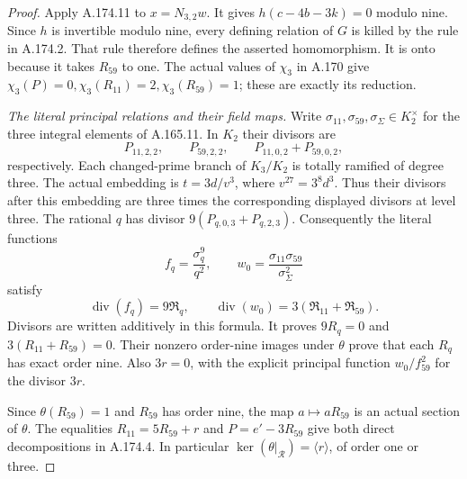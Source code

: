 \begin{proof}
Apply A.174.11 to \(x=N_{3,2}w\).
It gives \(h(c-4b-3k)=0\) modulo nine.
Since \(h\) is invertible modulo nine, every defining relation
of \(G\) is killed by the rule in A.174.2.
That rule therefore defines the asserted homomorphism.
It is onto because it takes \(R_{59}\) to one.
The actual values of \(\chi_3\) in A.170 give
\(\chi_3(P)=0,\chi_3(R_{11})=2,\chi_3(R_{59})=1\);
these are exactly its reduction.

\emph{The literal principal relations and their field maps.}
Write \(\sigma_{11},\sigma_{59},\sigma_\Sigma\in K_2^\times\)
for the three integral elements of A.165.11.
In \(K_2\) their divisors are
\[
 P_{11,2,2},\qquad P_{59,2,2},\qquad
                       P_{11,0,2}+P_{59,0,2},
\]
respectively.  Each changed-prime branch of \(K_3/K_2\) is
totally ramified of degree three.  The actual embedding is
\(t=3d/v^3\), where \(v^{27}=3^8d^3\).
Thus their divisors after this embedding are three times the
corresponding displayed divisors at level three.
The rational \(q\) has divisor
\(9(P_{q,0,3}+P_{q,2,3})\).  Consequently the literal functions
\[
       f_q=\frac{\sigma_q^9}{q^2},\qquad
       w_0=\frac{\sigma_{11}\sigma_{59}}{\sigma_\Sigma^2}
\tag{A.174.14}
\]
satisfy
\[
 \operatorname{div}(f_q)=9\mathfrak R_q,\qquad
 \operatorname{div}(w_0)=3(\mathfrak R_{11}+\mathfrak R_{59}).
\tag{A.174.15}
\]
Divisors are written additively in this formula.
It proves \(9R_q=0\) and \(3(R_{11}+R_{59})=0\).
Their nonzero order-nine images under \(\theta\) prove that
each \(R_q\) has exact order nine.
Also \(3r=0\), with the explicit principal function
\(w_0/f_{59}^2\) for the divisor \(3r\).

Since \(\theta(R_{59})=1\) and \(R_{59}\) has order nine,
the map \(a\mapsto aR_{59}\) is an actual section of \(\theta\).
The equalities
\(R_{11}=5R_{59}+r\) and \(P=e'-3R_{59}\) give both direct
decompositions in A.174.4.  In particular
\(\ker(\theta|_{\mathcal R})=\langle r\rangle\), of order one
or three.


\end{proof}
